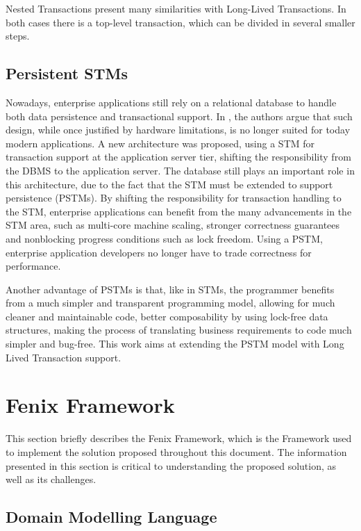 \documentclass{llncs}
\begin{document}
Nested Transactions present many similarities with Long-Lived
Transactions. In both cases there is a top-level transaction, which
can be divided in several smaller steps.

\subsection{Persistent STMs}
\label{sec:pstm}

Nowadays, enterprise applications still rely on a relational database
to handle both data persistence and transactional support. In
\cite{fernandes2011strict}, the authors argue that such design, while
once justified by hardware limitations, is no longer suited for today
modern applications. A new architecture was proposed, using a STM for
transaction support at the application server tier, shifting the
responsibility from the DBMS to the application server. The database
still plays an important role in this architecture, due to the fact
that the STM must be extended to support persistence (PSTMs).  By
shifting the responsibility for transaction handling to the STM,
enterprise applications can benefit from the many advancements in the
STM area, such as multi-core machine scaling, stronger correctness
guarantees and nonblocking progress conditions such as lock freedom.
Using a PSTM, enterprise application developers no longer have to
trade correctness for performance.

Another advantage of PSTMs is that, like in STMs, the programmer
benefits from a much simpler and transparent programming model,
allowing for much cleaner and maintainable code, better composability
by using lock-free data structures, making the process of translating
business requirements to code much simpler and bug-free. This work
aims at extending the PSTM model with Long Lived Transaction support.


\section{Fenix Framework}
\label{chap:ff}

This section briefly describes the Fenix Framework, which is the
Framework used to implement the solution proposed throughout this
document. The information presented in this section is critical to
understanding the proposed solution, as well as its challenges.

\subsection{Domain Modelling Language}
\label{sec:dml}
\end{document}
